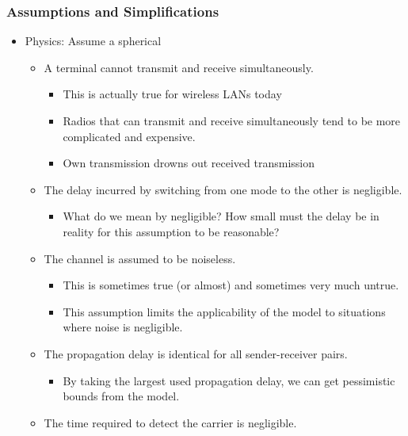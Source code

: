 \subsubsection{Assumptions and Simplifications}\label{subsubsec:Kleinrock_Tobagi_Model_Assumptions}
\begin{itemize}[noitemsep]
\item Physics: Assume a spherical
  \begin{itemize}[noitemsep]
  \item A terminal cannot transmit and receive simultaneously.
    \begin{itemize}[noitemsep]
    \item This is actually true for wireless LANs today
    \item Radios that can transmit and receive simultaneously tend to be more complicated and expensive.
    \item Own transmission drowns out received transmission
    \end{itemize}
  \item The delay incurred by switching from one mode to the other is negligible.
    \begin{itemize}[noitemsep]
    \item What do we mean by negligible? How small must the delay be in reality for this assumption to be reasonable?
    \end{itemize}
  \item The channel is assumed to be noiseless.
    \begin{itemize}[noitemsep]
    \item This is sometimes true (or almost) and sometimes very much untrue.
    \item This assumption limits the applicability of the model to situations where noise is negligible.
    \end{itemize}
  \item The propagation delay is identical for all sender-receiver pairs.
    \begin{itemize}[noitemsep]
    \item By taking the largest used propagation delay, we can get
      pessimistic bounds from the model.
    \end{itemize}
  \item The time required to detect the carrier is negligible.
  \end{itemize}


\end{itemize}
